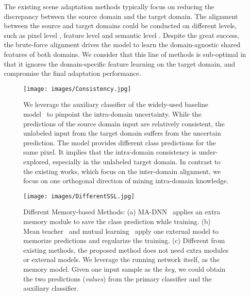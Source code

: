 \documentclass{article}
\begin{document}
The existing scene adaptation methods typically focus on reducing the discrepancy between the source domain and the target domain. The alignment between the source and target domains could be conducted on different levels, such as pixel level \cite{hoffman2018cycada,wu2018dcan},  feature level \cite{hoffman2018cycada,huang2018domain,yue2019domain,luo2019taking,zhang2019manifold} and semantic level \cite{tsai2018learning,tsai2019domain,wang2019class}. Despite the great success, the brute-force alignment drives the model to learn the domain-agnostic shared features of both domains. We consider that this line of methods is sub-optimal in that it ignores the domain-specific feature learning on the target domain, and compromise the final adaptation performance. 


\begin{figure}[t]
\begin{center}
     \texttt{[image: images/Consistency.jpg]}
\end{center} \vspace{-.2in}
      \caption{ We leverage the auxiliary classifier of the widely-used baseline model~\protect\cite{tsai2018learning} to pinpoint the intra-domain uncertainty. While the predictions of the source domain input are relatively consistent, the unlabeled input from the target domain suffers from the uncertain prediction. The model provides different class predictions for the same pixel. It implies that the intra-domain consistency is under-explored, especially in the unlabeled target domain. In contrast to the existing works, which focus on the inter-domain alignment, we focus on one orthogonal direction of mining intra-domain knowledge. }
      \label{fig:consistency}
\end{figure}

\begin{figure*}[t]
\begin{center}
     \texttt{[image: images/DifferentSSL.jpg]}
\end{center}
\vspace{-.1in}
      \caption{ Different Memory-based Methods: (a) MA-DNN~\protect\cite{chen2018semi} applies an extra memory module to save the class prediction while training. (b) Mean teacher~\protect\cite{tarvainen2017mean} and mutual learning~\protect\cite{zhang2018deep} apply one external model to memorize predictions and regularize the training. (c) Different from existing methods, the proposed method does not need extra modules or external models. We leverage the running network itself, as the memory model. Given one input sample as the \emph{key}, we could obtain the two predictions (\emph{values}) from the primary classifier and the auxiliary classifier. 
      }\label{fig:method}
\end{figure*}
\end{document}
